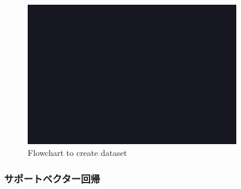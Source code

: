 \begin{figure}[ht]
  \begin{center}
  \vspace{1zh}
    \includegraphics[width=0.7\linewidth]{images/fig_sample.png}   
  \end{center}
  \caption{Flowchart to create dataset}
  \label{fig:flow_data_set}
\end{figure}

\subsubsection{サポートベクター回帰}
\label{sec:support_vector_regression}

\clearpage
\newpage